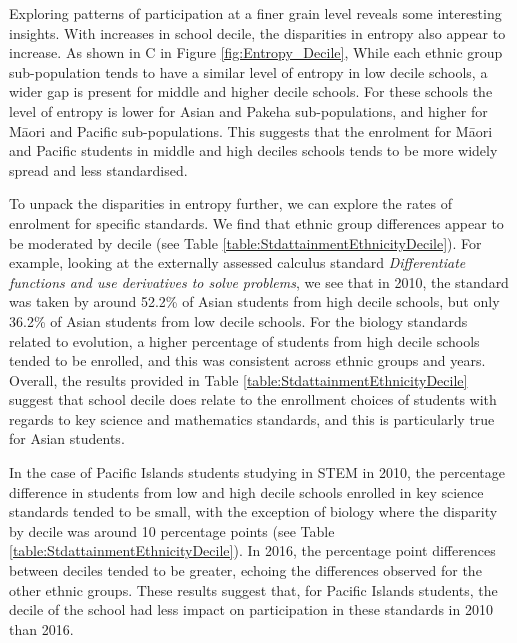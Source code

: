Exploring patterns of participation at a finer grain level reveals some interesting insights. With increases in school decile, the disparities in entropy also appear to increase. As shown in C in Figure \ref{fig:Entropy_Decile}, While each ethnic group sub-population tends to have a similar level of entropy in low decile schools, a wider gap is present for middle and higher decile schools. For these schools the level of entropy is lower for Asian and Pakeha sub-populations, and higher for M\={a}ori and Pacific sub-populations. This suggests that the enrolment for M\={a}ori and Pacific students in middle and high deciles schools tends to be more widely spread and less standardised. 

To unpack the disparities in entropy further, we can explore the rates of enrolment for specific standards. We find that ethnic group differences appear to be moderated by decile (see Table \ref{table:StdattainmentEthnicityDecile}). For example, looking at the externally assessed calculus standard \textit{Differentiate functions and use derivatives to solve problems}, we see that in 2010, the standard was taken by around 52.2\% of Asian students from high decile schools, but only 36.2\% of Asian students from low decile schools. For the biology standards related to evolution, a higher percentage of students from high decile schools tended to be enrolled, and this was consistent across ethnic groups and years. Overall, the results provided in Table \ref{table:StdattainmentEthnicityDecile} suggest that school decile does relate to the enrollment choices of students with regards to key science and mathematics standards, and this is particularly true for Asian students. 

In the case of Pacific Islands students studying in STEM in 2010, the percentage difference in students from low and high decile schools enrolled in key science standards tended to be small, with the exception of biology where the disparity by decile was around 10 percentage points (see Table \ref{table:StdattainmentEthnicityDecile}). In 2016, the percentage point differences between deciles tended to be greater, echoing the differences observed for the other ethnic groups. These results suggest that, for Pacific Islands students, the decile of the school had less impact on participation in these standards in 2010 than 2016. 

